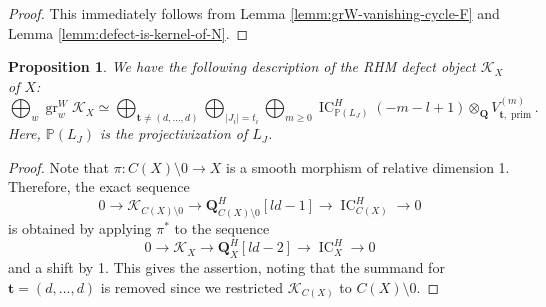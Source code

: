 \documentclass[letterpaper,11pt]{amsart}
\theoremstyle{plain}
\newtheorem{prop}[theo]{Proposition}
\theoremstyle{definition}
\theoremstyle{remark}
\newcommand{\PP}{\mathbb{P}}
\newcommand{\QQ}{\mathbf{Q}}
\newcommand{\cK}{\mathcal{K}}
\newcommand{\uind}[1]{^{(#1)}}
\newcommand{\sta}{^{*}}
\DeclareMathOperator{\gr}{gr}
\DeclareMathOperator{\prim}{prim}
\DeclareMathOperator{\IC}{IC}
\newcommand{\bft}{\mathbf{t}}
\begin{document}
    \begin{proof}
    This immediately follows from Lemma \ref{lemm:grW-vanishing-cycle-F} and Lemma \ref{lemm:defect-is-kernel-of-N}.
    \end{proof}

    \begin{prop} \label{prop:RHM-defect-object-X-graded}
        We have the following description of the RHM defect object $\cK_{X}$ of $X$:
        $$ \bigoplus_{w} \gr_{w}^{W} \cK_{X} \simeq \bigoplus_{\bft \neq (d, \ldots, d)} \bigoplus_{|J_{i}| = t_{i}} \bigoplus_{m \geq 0} \IC_{\PP(L_{J})}^{H} (-m-l+1) \otimes_{\QQ} V_{\bft, \prim}\uind{m}.$$
        Here, $\PP(L_{J})$ is the projectivization of $L_{J}$.
    \end{prop}
    \begin{proof}
        Note that $\pi \colon C(X) \setminus 0 \to X$ is a smooth morphism of relative dimension 1. Therefore, the exact sequence
        $$ 0 \to \cK_{C(X) \setminus 0} \to \QQ_{C(X) \setminus 0}^{H}[ld-1] \to \IC_{C(X)}^{H} \to 0$$
        is obtained by applying $\pi\sta$ to the sequence
        $$ 0 \to \cK_{X} \to \QQ_{X}^{H}[ld-2] \to \IC_{X}^{H} \to 0$$
        and a shift by 1. This gives the assertion, noting that the summand for $\bft = (d,\ldots, d)$ is removed since we restricted $\cK_{C(X)}$ to $C(X) \setminus 0$.
    \end{proof}
\end{document}
